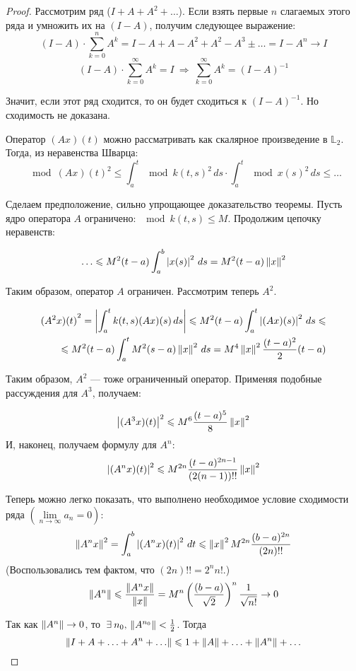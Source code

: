 \documentclass[12pt]{article}
\begin{document}
		\begin{proof}
			Рассмотрим ряд ($I + A + A^2 + \ldots$). Если взять первые $n$ слагаемых этого ряда и умножить их на $(I - A)$, 
			получим следующее выражение:
			$$(I-A) \cdot \sum_{k=0}^n A^k = I - A + A - A^2 + A^2 - A^3 \pm\ldots = I - A^n \rightarrow I$$
			$$(I-A) \cdot \sum_{k=0}^\infty A^k = I ~ \Rightarrow ~ \sum_{k=0}^\infty A^k = (I-A)^{-1}$$

			Значит, если этот ряд сходится, то он будет сходиться к $(I - A)^{-1}$. Но сходимость не доказана.
		
			Оператор $(Ax)(t)$ можно рассматривать как скалярное произведение в $\mathbb{L}_2$. Тогда, из неравенства Шварца:
			$$\mod{(Ax)(t)}^2 \leq 
			  \int_a^t \mod{k(t,s)}^2 \,ds \cdot \int_a^t \mod{x(s)}^2 \,ds \leq \ldots$$
			  
			Сделаем предположение, сильно упрощающее доказательство теоремы. Пусть ядро оператора $A$ 
			ограничено: $\mod{k(t,s)} \leq M$. Продолжим цепочку неравенств:
		
			$$\ldots \leqslant M^2(t-a) \int_a^b \left| x(s) \right|^2 \,ds = M^2(t-a)\left\| x \right\|^2$$
		
			Таким образом, оператор $A$ ограничен. Рассмотрим теперь $A^2$.
		
			\begin{align*}
				{(A^2x)(t)}^2 = \left| \int_a^t k(t,s)(Ax)(s) \,ds \right| \leqslant M^2(t-a)\int_a^t\left| (Ax)(s) \right|^2\,ds \leqslant \\ 
				\leqslant M^2(t-a)\int_a^tM^2(s-a)\left\| x \right\|^2 \,ds = M^4 \left\| x \right\|^2 \frac{(t-a)^2}{2}(t-a)
			\end{align*}
		
			Таким образом, $A^2$ --- тоже ограниченный оператор. Применяя подобные рассуждения для $A^3$, получаем:
		
			$$\left| (A^3x)(t) \right|^2 \leqslant M^6 \frac{(t-a)^5}{8}\left\| x \right\|^2 $$
			И, наконец, получаем формулу для $A^n$:
			$$\left| (A^nx)(t) \right|^2 \leqslant M^{2n} \frac{(t-a)^{2n-1}}{(2(n-1))!!}\left\| x \right\|^2 $$
		
			Теперь можно легко показать, что выполнено необходимое условие сходимости ряда 
			$\left(\underset{n\rightarrow\infty}{\lim} a_n = 0\right)$:
			$$\left\| A^nx \right\|^2 = \int_a^b \left| (A^nx)(t) \right|^2 \,dt \leqslant \left\| x \right\|^2 M^{2n} \frac{(b-a)^{2n}}{(2n)!!}$$
			{\color{gray} (Воспользовались тем фактом, что $(2n)!! = 2^n n!$.)}
			$$\left\| A^n \right\| \leqslant \frac{\left\| A^nx \right\|}{\left\| x \right\|} =
			  M^n \left(\frac{(b-a)}{\sqrt{2}}\right)^n \frac{1}{\sqrt{n!}} \rightarrow 0$$
			  
			Так как $\left\| A^n \right\| \rightarrow 0$, то $\exists n_0,\,\norm{A^{n_0}} < \frac{1}{2}$. Тогда
			$$\left\| I + A + \ldots + A^n + \ldots \right\| \leqslant 1 + \left\| A \right\| + \ldots + \left\| A^n \right\| + \ldots$$
		

\end{proof}
\end{document}

